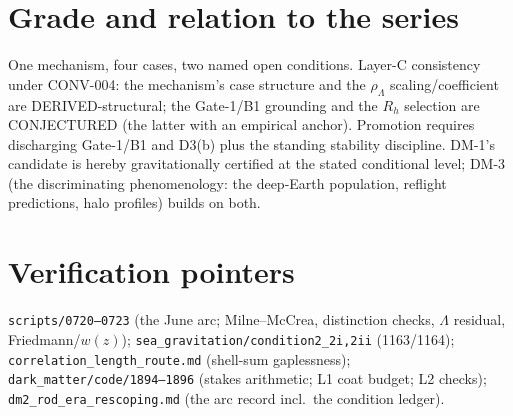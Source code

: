 \documentclass[11pt]{article}
\newcommand{\rL}{\rho_\Lambda}
\newcommand{\Rh}{R_h}
\begin{document}
\section{Grade and relation to the series}
One mechanism, four cases, two named open conditions. Layer-C consistency under CONV-004: the
mechanism's case structure and the $\rL$ scaling/coefficient are DERIVED-structural; the Gate-1/B1
grounding and the $\Rh$ selection are CONJECTURED (the latter with an empirical anchor). Promotion
requires discharging Gate-1/B1 and D3(b) plus the standing stability discipline. DM-1's candidate is
hereby gravitationally certified at the stated conditional level; DM-3 (the discriminating
phenomenology: the deep-Earth population, reflight predictions, halo profiles) builds on both.

\section*{Verification pointers}
\texttt{scripts/0720--0723} (the June arc; Milne--McCrea, distinction checks, $\Lambda$ residual,
Friedmann/$w(z)$); \texttt{sea\_gravitation/condition2\_2i,2ii} (1163/1164);
\texttt{correlation\_length\_route.md} (shell-sum gaplessness);
\texttt{dark\_matter/code/1894--1896} (stakes arithmetic; L1 coat budget; L2 checks);
\texttt{dm2\_rod\_era\_rescoping.md} (the arc record incl.\ the condition ledger).
\end{document}
